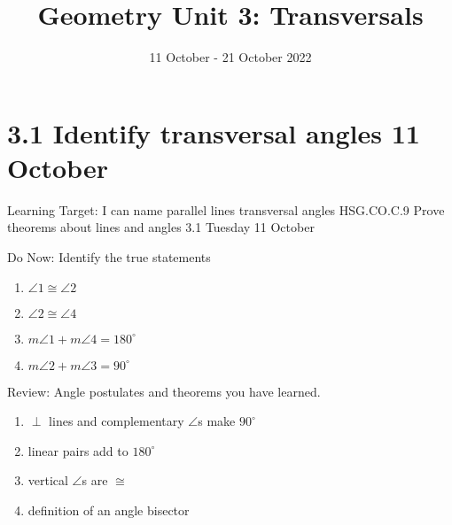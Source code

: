 

\title{Geometry Unit 3: Transversals}
\date{11 October - 21 October 2022}


\frame{\titlepage}
\section[Outline]{}
\frame{\tableofcontents}

\section{3.1 Identify transversal angles \hfill 11 October}
\begin{frame}{Learning Target: I can name parallel lines transversal angles}
  {HSG.CO.C.9 Prove theorems about lines and angles  \hfill \alert{3.1 Tuesday 11 October}}
  \begin{block}{Do Now: Identify the true statements}
    \begin{multicols}{2}
    \begin{enumerate}
      \item $\angle 1 \cong \angle 2$
      \item $\angle 2 \cong \angle 4$
      \item $m\angle 1 + m\angle 4=180^\circ$
      \item $m\angle 2 + m\angle 3=90^\circ$
  \end{enumerate}
  \begin{center}
  \end{center}
\end{multicols}
\end{block}
    Review: Angle postulates and theorems you have learned. 
    \begin{enumerate}
      \item $\perp$ lines and complementary $\angle$s make $90^\circ$
      \item linear pairs add to $180^\circ$
      \item vertical $\angle$s are $\cong$
      \item definition of an angle bisector
    \end{enumerate}
\end{frame}

